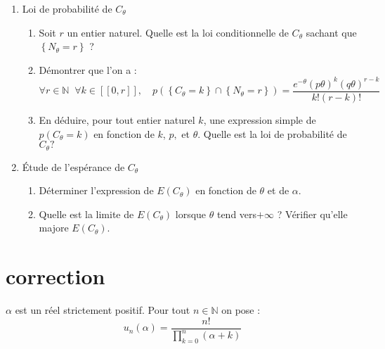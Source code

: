 \documentclass[a4paper, 11pt,reqno]{article}
\begin{document}
\begin{enumerate}
\item Loi de probabilité de $C_{\theta }$

\begin{enumerate}
\item Soit $r$ un entier naturel. Quelle est la loi conditionnelle de $%
C_{\theta }$ sachant que $\left\{ N_{\theta }=r\right\} $ ?

\item Démontrer que l'on a : 
\begin{equation*}
\forall r\in \mathbb{N\;\;\forall }k\in \left[ \left[ 0,r\right] \right]
,\quad p\left( \left\{ C_{\theta }=k\right\} \cap \left\{ N_{\theta
}=r\right\} \right) =\dfrac{e^{-\theta }\left( p\theta \right) ^{k}\left(
q\theta \right) ^{r-k}}{k!\left( r-k\right) !}
\end{equation*}

\item En déduire, pour tout entier naturel $k$, une expression simple de $%
p\left( C_{\theta }=k\right) $ en fonction de $k$, $p,$ et $\theta $. Quelle
est la loi de probabilité de $C_{\theta }?$
\end{enumerate}

\item Étude de l'espérance de $C_{\theta }$

\begin{enumerate}
\item Déterminer l'expression de $E\left( C_{\theta }\right) $ en fonction
de $\theta $ et de $\alpha $.

\item Quelle est la limite de $E\left( C_{\theta }\right) $ lorsque $\theta $
tend vers$+\infty $ ? Vérifier qu'elle majore $E\left( C_{\theta }\right) $.
\end{enumerate}
\end{enumerate}




\section{correction}


$\alpha $ est un r\'{e}el strictement positif. Pour tout $n\in \mathbb{N}$
on pose : 
\begin{equation*}
u_{n}\left( \alpha \right) =\frac{n!}{\prod\limits_{k=0}^{n}\left( \alpha
+k\right) }
\end{equation*}
\end{document}
